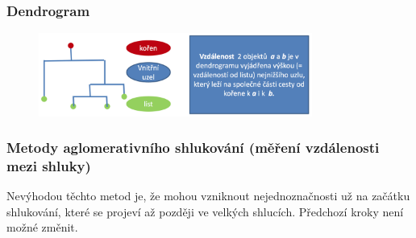 \subsubsection{Dendrogram}
\begin{figure}[H]
	\centering
	\includegraphics[width=0.8\textwidth]{assets/10_dendrogram}
\end{figure}

\subsubsection{Metody aglomerativního shlukování (měření vzdálenosti mezi shluky)}
Nevýhodou těchto metod je, že mohou vzniknout nejednoznačnosti už na začátku shlukování, které se projeví až později ve velkých shlucích. Předchozí kroky není možné změnit.
